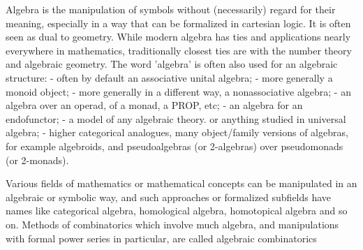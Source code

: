 \documentclass[main.tex]{subfiles}
\begin{document}
Algebra is the manipulation of symbols without (necessarily) regard for their meaning, especially in a way that can be formalized in cartesian logic. It is often seen as dual to geometry. While modern algebra has ties and applications nearly everywhere in mathematics, traditionally closest ties are with the number theory and algebraic geometry.
The word 'algebra' is often also used for an algebraic structure:
- often by default an associative unital algebra;
- more generally a monoid object;
- more generally in a different way, a nonassociative algebra;
- an algebra over an operad, of a monad, a PROP, etc;
- an algebra for an endofunctor;
- a model of any algebraic theory. or anything studied in universal algebra;
- higher categorical analogues, many object/family versions of algebras, for example algebroids, and pseudoalgebras (or 2-algebras) over pseudomonads (or 2-monads).

Various fields of mathematics or mathematical concepts can be manipulated in an algebraic or symbolic way, and such approaches or formalized subfields have names like categorical algebra, homological algebra, homotopical algebra and so on. Methods of combinatorics which involve much algebra, and manipulations with formal power series in particular, are called algebraic combinatorics
\end{document}
